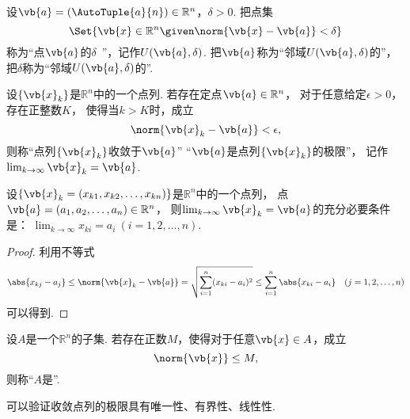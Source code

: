 \begin{definition}
设\(\vb{a}=(\AutoTuple{a}{n})\in\mathbb{R}^n\)，\(\delta>0\).
把点集\begin{equation*}
	\Set{ \vb{x}\in\mathbb{R}^n \given \norm{\vb{x}-\vb{a}}<\delta }
\end{equation*}称为“点\(\vb{a}\)的\(\delta\)~”，记作\(U(\vb{a},\delta)\).
把\(\vb{a}\)称为“邻域\(U(\vb{a},\delta)\)的”，
把\(\delta\)称为“邻域\(U(\vb{a},\delta)\)的”.
\end{definition}
\begin{definition}
设\(\{\vb{x}_k\}\)是\(\mathbb{R}^n\)中的一个点列.
若存在定点\(\vb{a}\in\mathbb{R}^n\)，
对于任意给定\(\epsilon>0\)，存在正整数\(K\)，
使得当\(k>K\)时，成立\begin{equation*}
	\norm{\vb{x}_k-\vb{a}}<\epsilon,
\end{equation*}
则称“点列\(\{\vb{x}_k\}\)收敛于\(\vb{a}\)”
“\(\vb{a}\)是点列\(\{\vb{x}_k\}\)的极限”，
记作\(\lim_{k\to\infty} \vb{x}_k = \vb{a}\).
\end{definition}
\begin{theorem}
设\(\{\vb{x}_k=(x_{k1},x_{k2},\dotsc,x_{kn})\}\)是\(\mathbb{R}^n\)中的一个点列，
点\(\vb{a}=(a_1,a_2,\dotsc,a_n)\in\mathbb{R}^n\)，
则\(\lim_{k\to\infty} \vb{x}_k = \vb{a}\)的充分必要条件是：
\(\lim_{k\to\infty} x_{ki} = a_i\ (i=1,2,\dotsc,n)\).
\begin{proof}
利用不等式\begin{equation*}
	\abs{x_{kj}-a_j}
	\leq \norm{\vb{x}_k-\vb{a}}
	= \sqrt{\sum_{i=1}^n (x_{ki}-a_i)^2}
	\leq \sum_{i=1}^n \abs{x_{ki}-a_i}
	\quad(j=1,2,\dotsc,n)
\end{equation*}可以得到.
\end{proof}
\end{theorem}

\begin{definition}
设\(A\)是一个\(\mathbb{R}^n\)的子集.
若存在正数\(M\)，使得对于任意\(\vb{x} \in A\)，成立\begin{equation*}
	\norm{\vb{x}} \leq M,
\end{equation*}
则称“\(A\)是”.
\end{definition}
可以验证收敛点列的极限具有唯一性、有界性、线性性.

